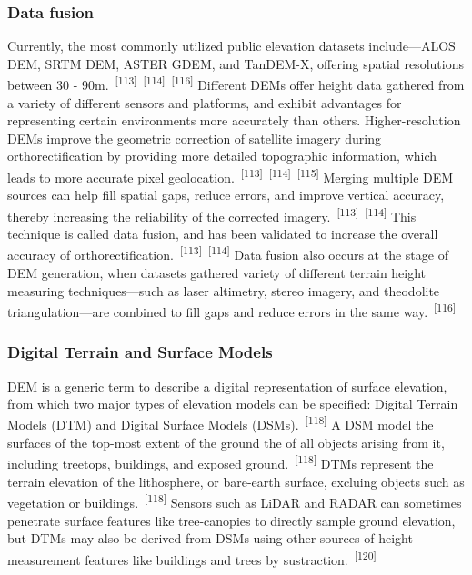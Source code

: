 \documentclass{article}
\begin{document}
\subsubsection{Data fusion}

\par{Currently, the most commonly utilized public elevation datasets include---ALOS DEM, SRTM DEM, ASTER GDEM, and TanDEM-X, offering spatial resolutions between 30 - 90m.~\textsuperscript{[113]}~\textsuperscript{[114]}~\textsuperscript{[116]} Different DEMs offer height data gathered from a variety of different sensors and platforms, and exhibit advantages for representing certain environments more accurately than others. Higher-resolution DEMs improve the geometric correction of satellite imagery during orthorectification by providing more detailed topographic information, which leads to more accurate pixel geolocation.~\textsuperscript{[113]}~\textsuperscript{[114]}~\textsuperscript{[115]} Merging multiple DEM sources can help fill spatial gaps, reduce errors, and improve vertical accuracy, thereby increasing the reliability of the corrected imagery.~\textsuperscript{[113]}~\textsuperscript{[114]} This technique is called data fusion, and has been validated to increase the overall accuracy of orthorectification.~\textsuperscript{[113]}~\textsuperscript{[114]} Data fusion also occurs at the stage of DEM generation, when datasets gathered variety of different terrain height measuring techniques---such as laser altimetry, stereo imagery, and theodolite triangulation---are combined to fill gaps and reduce errors in the same way.~\textsuperscript{[116]}}

\subsubsection{Digital Terrain and Surface Models}


\par{DEM is a generic term to describe a digital representation of surface elevation, from which two major types of elevation models can be specified: Digital Terrain Models (DTM) and Digital Surface Models (DSMs).~\textsuperscript{[118]} A DSM model the surfaces of the top-most extent of the ground the of all objects arising from it, including treetops, buildings, and exposed ground.~\textsuperscript{[118]} DTMs represent the terrain elevation of the lithosphere, or bare-earth surface, excluing objects such as vegetation or buildings.~\textsuperscript{[118]} Sensors such as LiDAR and RADAR can sometimes penetrate surface features like tree-canopies to directly sample ground elevation, but DTMs may also be derived from DSMs using other sources of height measurement features like buildings and trees by sustraction.~\textsuperscript{[120]}}
\end{document}
